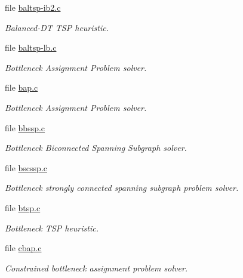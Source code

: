 \begin{CompactItemize}
\item 
file \hyperlink{bin_2baltsp-ib2_8c}{baltsp-ib2.c}
\begin{CompactList}\small\item\em Balanced-DT TSP heuristic. \item\end{CompactList}

\item 
file \hyperlink{bin_2baltsp-lb_8c}{baltsp-lb.c}
\begin{CompactList}\small\item\em Bottleneck Assignment Problem solver. \item\end{CompactList}

\item 
file \hyperlink{bin_2bap_8c}{bap.c}
\begin{CompactList}\small\item\em Bottleneck Assignment Problem solver. \item\end{CompactList}

\item 
file \hyperlink{bin_2bbssp_8c}{bbssp.c}
\begin{CompactList}\small\item\em Bottleneck Biconnected Spanning Subgraph solver. \item\end{CompactList}

\item 
file \hyperlink{bin_2bscssp_8c}{bscssp.c}
\begin{CompactList}\small\item\em Bottleneck strongly connected spanning subgraph problem solver. \item\end{CompactList}

\item 
file \hyperlink{bin_2btsp_8c}{btsp.c}
\begin{CompactList}\small\item\em Bottleneck TSP heuristic. \item\end{CompactList}

\item 
file \hyperlink{bin_2cbap_8c}{cbap.c}
\begin{CompactList}\small\item\em Constrained bottleneck assignment problem solver. \item\end{CompactList}


\end{CompactItemize}
